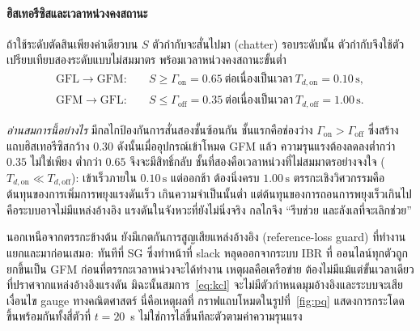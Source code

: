 \documentclass[12pt,a4paper]{article}
\newcommand{\second}{\,\mathrm{s}}
\begin{document}
\paragraph{ฮิสเทอรีซิสและเวลาหน่วงคงสถานะ}
ถ้าใช้ระดับตัดสินเพียงค่าเดียวบน $S$ ตัวกำกับจะสั่นไปมา (chatter) รอบระดับนั้น
ตัวกำกับจึงใช้ตัวเปรียบเทียบสองระดับแบบไม่สมมาตร พร้อมเวลาหน่วงคงสถานะขั้นต่ำ
\begin{equation}
  \begin{aligned}
    \text{GFL}\to\text{GFM}:&\quad S\ge\Gamma_{\mathrm{on}}=0.65
       \ \text{ต่อเนื่องเป็นเวลา}\ T_{d,\mathrm{on}}=0.10\second,\\
    \text{GFM}\to\text{GFL}:&\quad S\le\Gamma_{\mathrm{off}}=0.35
       \ \text{ต่อเนื่องเป็นเวลา}\ T_{d,\mathrm{off}}=1.00\second.
  \end{aligned}
  \label{eq:hyst}
\end{equation}

\emph{อ่านสมการนี้อย่างไร} มีกลไกป้องกันการสั่นสองชั้นซ้อนกัน ชั้นแรกคือช่องว่าง
$\Gamma_{\mathrm{on}}>\Gamma_{\mathrm{off}}$ ซึ่งสร้างแถบฮิสเทอรีซิสกว้าง $0.30$
ดังนั้นเมื่ออุปกรณ์เข้าโหมด GFM แล้ว ความรุนแรงต้องลดลงต่ำกว่า $0.35$ ไม่ใช่เพียง
ต่ำกว่า $0.65$ จึงจะมีสิทธิ์กลับ ชั้นที่สองคือเวลาหน่วงที่ไม่สมมาตรอย่างจงใจ
($T_{d,\mathrm{on}}\ll T_{d,\mathrm{off}}$): เข้าเร็วภายใน $0.10\second$ แต่ออกช้า
ต้องนิ่งครบ $1.00\second$ ตรรกะเชิงวิศวกรรมคือ ต้นทุนของการเพิ่มการพยุงแรงดันเร็ว
เกินความจำเป็นนั้นต่ำ แต่ต้นทุนของการถอนการพยุงเร็วเกินไปคือระบบอาจไม่มีแหล่งอ้างอิง
แรงดันในจังหวะที่ยังไม่นิ่งจริง กลไกจึง ``รีบช่วย และลังเลที่จะเลิกช่วย''

นอกเหนือจากตรรกะข้างต้น ยังมีเกตกันการสูญเสียแหล่งอ้างอิง (reference-loss guard)
ที่ทำงานแยกและมาก่อนเสมอ: ทันทีที่ SG ซึ่งทำหน้าที่ slack หลุดออกจากระบบ IBR ที่
ออนไลน์ทุกตัวถูกยกขึ้นเป็น GFM ก่อนที่ตรรกะเวลาหน่วงจะได้ทำงาน เหตุผลคือเครือข่าย
ต้องไม่มีแม้แต่ขั้นเวลาเดียวที่ปราศจากแหล่งอ้างอิงแรงดัน มิฉะนั้นสมการ~\eqref{eq:kcl}
จะไม่มีตัวกำหนดมุมอ้างอิงและระบบจะเสียเงื่อนไข gauge ทางคณิตศาสตร์ นี่คือเหตุผลที่
กราฟแถบโหมดในรูปที่~\ref{fig:pq} แสดงการกระโดดขึ้นพร้อมกันทั้งสี่ตัวที่ $t=20$~s
ไม่ใช่การไล่ขึ้นทีละตัวตามค่าความรุนแรง

\end{document}
